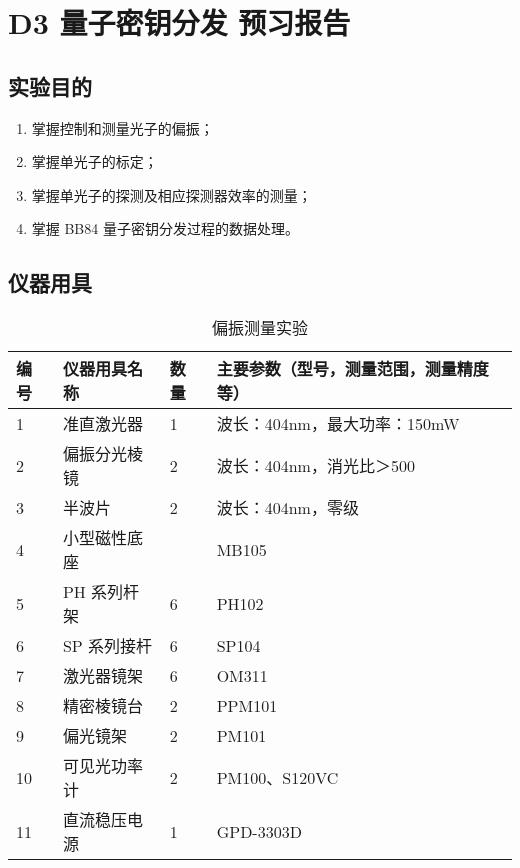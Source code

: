 \documentclass[dvipsnames, svgnames,a4paper,11pt]{article}
\begin{document}
\setcounter{section}{0}
\section{D3 \quad 量子密钥分发 \quad\heiti 预习报告}
	
\subsection{实验目的}
\begin{enumerate}
	\item 掌握控制和测量光子的偏振；
	\item 掌握单光子的标定；
	\item 掌握单光子的探测及相应探测器效率的测量；
	\item 掌握 BB84 量子密钥分发过程的数据处理。
	
\end{enumerate}

\subsection{仪器用具}
\begin{table}[htbp]
	\centering
	\renewcommand\arraystretch{1.6}
	\caption{偏振测量实验}
	\begin{tabular}{p{}|p{}|p{}|p{}}
		\hline
		编号& 仪器用具名称 & 数量 &  主要参数（型号，测量范围，测量精度等） \\
		\hline
		1	&	准直激光器 	& 1 & 波长：404nm，最大功率：150mW\\

		2	&	偏振分光棱镜 	& 2 & 波长：404nm，消光比＞500	 \\
		
		3	&	半波片 & 2 &	波长：404nm，零级 	\\
		
		4	&	小型磁性底座	&  & MB105	\\
		
		5	&	PH 系列杆架	& 6 & PH102	\\

		6	&	SP 系列接杆	& 6 & SP104 \\

		7	&	激光器镜架	& 6 & OM311	\\

		8	&	精密棱镜台	& 2 & PPM101	\\

		9	&	偏光镜架	& 2 & PM101	\\

		10	&	可见光功率计& 2 & PM100、S120VC	\\

		11	&	直流稳压电源& 1 & GPD-3303D	\\
		\hline
	\end{tabular}
\end{table}
\end{document}
